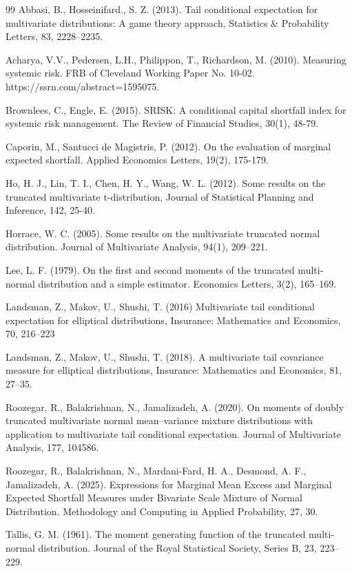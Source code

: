 \documentclass[twoside]{article}
\begin{document}
\begin{thebibliography}{99}
	 Abbasi, B., Hosseinifard., S. Z. (2013). Tail conditional
	expectation for multivariate distributions: A game theory approach,
	Statistics \& Probability Letters, 83, 2228--2235.
	
	 Acharya, V.V., Pedersen, L.H., Philippon, T., Richardson, M.
	(2010). Measuring systemic risk. FRB of Cleveland Working Paper No. 10-02.
	https://ssrn.com/abstract=1595075.
	
	 Brownlees, C., Engle, E. (2015). SRISK: A conditional capital
	shortfall index for systemic risk management. The Review of Financial
	Studies, 30(1), 48-79.
	
	 Caporin, M., Santucci de Magistris, P. (2012). On the evaluation
	of marginal expected shortfall. Applied Economics Letters, 19(2), 175-179.
	
	 Ho, H. J., Lin, T. I., Chen, H. Y., Wang, W. L. (2012). Some
	results on the truncated multivariate t-distribution, Journal of Statistical
	Planning and Inference, 142, 25-40.
	
	 Horrace, W. C. (2005). Some results on the multivariate truncated
	normal distribution. Journal of Multivariate Analysis, 94(1), 209--221.
	
	 Lee, L. F. (1979). On the first and second moments of the
	truncated multi-normal distribution and a simple estimator. Economics
	Letters, 3(2), 165--169.
	
	 Landsman, Z., Makov, U., Shushi, T. (2016) Multivariate tail conditional expectation for elliptical distributions, Insurance: Mathematics and Economics, 70, 216--223
	
	 Landsman, Z., Makov, U., Shushi, T. (2018). A multivariate tail
	covariance measure for elliptical distributions, Insurance: Mathematics and
	Economics, 81, 27--35.
	
	 Roozegar, R., Balakrishnan, N., Jamalizadeh, A. (2020). On
	moments of doubly truncated multivariate normal mean--variance mixture
	distributions with application to multivariate tail conditional expectation.
	Journal of Multivariate Analysis, 177, 104586.
	
	 Roozegar, R., Balakrishnan, N., Mardani-Fard, H. A., Desmond, A.
	F., Jamalizadeh, A. (2025). Expressions for Marginal Mean Excess and
	Marginal Expected Shortfall Measures under Bivariate Scale Mixture of Normal
	Distribution. Methodology and Computing in Applied Probability, 27, 30.
	
	 Tallis, G. M. (1961). The moment generating function of the
	truncated multi-normal distribution. Journal of the Royal Statistical
	Society, Series B, 23, 223--229.
\end{thebibliography}
 
\end{document}

